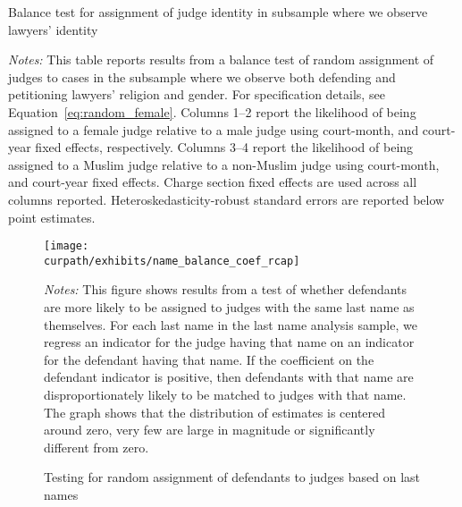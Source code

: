 \documentclass[12pt,english]{article}
\newcommand{\HOME}{\string~}
\newcommand{\curpath}{\HOME/ddl/justice-overleaf}
\newcommand{\curpath}{.}
\begin{document}
\begin{appendices}
\begin{table} [h!]
    \begin{center}
      \caption{Balance test for assignment of judge identity in subsample where we observe lawyers' identity}
    \label{tab:bal_lawyer}
     
     \begin{minipage}{0.95\textwidth}
   {\footnotesize \emph{Notes:} This table reports results from a balance test of random assignment of judges to cases in the subsample where we observe both defending and petitioning lawyers' religion and gender. For specification details, see Equation~\ref{eq:random_female}. Columns 1--2 report the likelihood of being assigned to a female judge relative to a male judge using court-month, and court-year fixed effects, respectively. Columns 3--4 report the likelihood of being assigned to a Muslim judge relative to a non-Muslim judge using court-month, and court-year fixed effects. Charge section fixed effects are used across all columns reported. Heteroskedasticity-robust standard errors are reported below point estimates. } \\
     \end{minipage}
     \end{center}
\end{table}

  \begin{figure}[h!]
    \centering
    \caption{Testing for random assignment of defendants to judges based on last names}
    \texttt{[image: \\curpath/exhibits/name\_balance\_coef\_rcap]} 
    \label{fig:last_name_balance}
    \begin{minipage}{1.0\textwidth}
      {\scriptsize \emph{Notes:} This figure shows results from a test of whether defendants are more likely to be assigned to judges with the same last name as themselves. For each last name in the last name analysis sample, we regress an indicator for the judge having that name on an indicator for the defendant having that name. If the coefficient on the defendant indicator is positive, then defendants with that name are disproportionately likely to be matched to judges with that name. The graph shows that the distribution of estimates is centered around zero, very few are large in magnitude or significantly different from zero.\par}
    \end{minipage}
  \end{figure}

\end{appendices}
\end{document}
